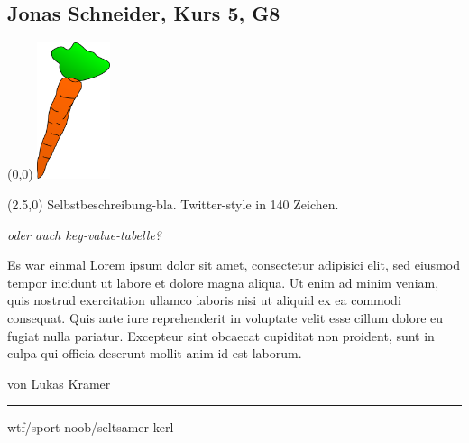 \subsection*{Jonas Schneider, Kurs 5, G8}
\begin{textblock}{2.5}(0,0)
	\noindent\mbox{\includegraphics[height=4cm ]{karotte2.png}} %
\end{textblock}

\begin{textblock}{10}(2.5,0)
	\setlength{\parindent}{0cm}
	Selbstbeschreibung-bla. Twitter-style in 140 Zeichen.
	
	{\em oder auch key-value-tabelle?}
\end{textblock}

\vspace{4.5cm}
Es war einmal Lorem ipsum dolor sit amet, consectetur adipisici elit, sed eiusmod tempor incidunt ut labore et dolore magna aliqua. Ut enim ad minim veniam, quis nostrud exercitation ullamco laboris nisi ut aliquid ex ea commodi consequat. Quis aute iure reprehenderit in voluptate velit esse cillum dolore eu fugiat nulla pariatur. Excepteur sint obcaecat cupiditat non proident, sunt in culpa qui officia deserunt mollit anim id est laborum.

\vspace{3mm}
von Lukas Kramer
\vfill
\hrule
\vspace{2mm}
{\small
wtf\//\/sport-noob\//\/seltsamer kerl
}

\newpage
